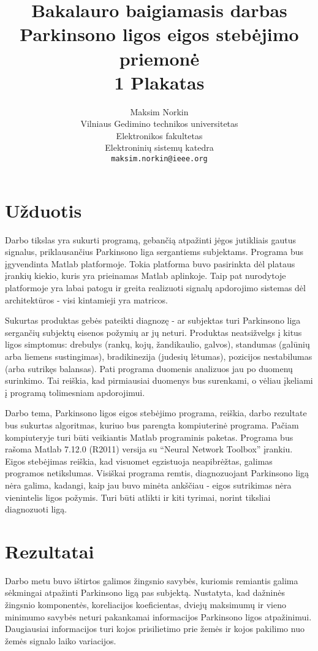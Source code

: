 \documentclass[a4paper,11pt,twocolumn]{IEEEtran}
\author{Maksim Norkin\\Vilniaus Gedimino technikos universitetas\\Elektronikos fakultetas\\Elektroninių sistemų katedra\\\texttt{maksim.norkin@ieee.org}}
\title{Bakalauro baigiamasis darbas\\Parkinsono ligos eigos stebėjimo priemonė\\1 Plakatas}
\begin{document}
	\maketitle
	
	\section{Užduotis}
	
	Darbo tikslas yra sukurti programą, gebančią atpažinti jėgos jutikliais gautus signalus, priklausančius Parkinsono liga sergantiems subjektams. Programa bus įgyvendinta Matlab platformoje. Tokia platforma buvo pasirinkta dėl plataus įrankių kiekio, kuris yra prieinamas Matlab aplinkoje. Taip pat nurodytoje platformoje yra labai patogu ir greita realizuoti signalų apdorojimo sistemas dėl architektūros - visi kintamieji yra matricos. 
	
	Sukurtas produktas gebės pateikti diagnozę - ar subjektas turi Parkinsono liga sergančių subjektų eisenos požymių ar jų neturi. Produktas neatsižvelgs į kitus ligos simptomus: drebulys (rankų, kojų, žandikaulio, galvos), standumas (galūnių arba liemens sustingimas), bradikinezija (judesių lėtumas), pozicijos nestabilumas (arba sutrikęs balansas). Pati programa duomenis analizuos jau po duomenų surinkimo. Tai reiškia, kad pirmiausiai duomenys bus surenkami, o vėliau įkeliami į programą tolimesniam apdorojimui.

	Darbo tema, Parkinsono ligos eigos stebėjimo programa, reiškia, darbo rezultate bus sukurtas algoritmas, kuriuo bus parengta kompiuterinė programa. Pačiam kompiuteryje turi būti veikiantis Matlab programinis paketas. Programa bus rašoma Matlab 7.12.0 (R2011) versija su ``Neural Network Toolbox'' įrankiu. Eigos stebėjimas reiškia, kad visuomet egzistuoja neapibrėžtas, galimas programos netikslumas. Visiškai programa remtis, diagnozuojant Parkinsono ligą nėra galima, kadangi, kaip jau buvo minėta ankščiau - eigos sutrikimas nėra vienintelis ligos požymis. Turi būti atlikti ir kiti tyrimai, norint tiksliai diagnozuoti ligą.
	
	\vfill
	
	\section{Rezultatai}
	
	Darbo metu buvo ištirtos galimos žingsnio savybės, kuriomis remiantis galima sėkmingai atpažinti Parkinsono ligą pas subjektą. Nustatyta, kad dažninės žingsnio komponentės, koreliacijos koeficientas, dviejų maksimumų ir vieno minimumo savybės neturi pakankamai informacijos Parkinsono ligos atpažinimui. Daugiausiai informacijos turi kojos prisilietimo prie žemės ir kojos pakilimo nuo žemės signalo laiko variacijos.
	
\end{document}
